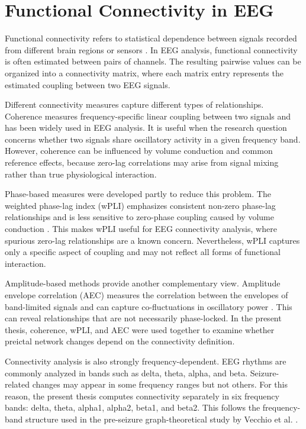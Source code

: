 \section{Functional Connectivity in EEG}
\label{sec:background-functional-connectivity}

Functional connectivity refers to statistical dependence between signals
recorded from different brain regions or sensors \cite{Friston1994}. In EEG
analysis, functional connectivity is often estimated between pairs of channels.
The resulting pairwise values can be organized into a connectivity matrix, where
each matrix entry represents the estimated coupling between two EEG signals.

Different connectivity measures capture different types of relationships.
Coherence measures frequency-specific linear coupling between two signals and
has been widely used in EEG analysis. It is useful when the research question
concerns whether two signals share oscillatory activity in a given frequency
band. However, coherence can be influenced by volume conduction and common
reference effects, because zero-lag correlations may arise from signal mixing
rather than true physiological interaction.

Phase-based measures were developed partly to reduce this problem. The weighted
phase-lag index (wPLI) emphasizes consistent non-zero phase-lag relationships
and is less sensitive to zero-phase coupling caused by volume conduction
\cite{Vinck2011}. This makes wPLI useful for EEG connectivity analysis, where
spurious zero-lag relationships are a known concern. Nevertheless, wPLI captures
only a specific aspect of coupling and may not reflect all forms of functional
interaction.

Amplitude-based methods provide another complementary view. Amplitude envelope
correlation (AEC) measures the correlation between the envelopes of
band-limited signals and can capture co-fluctuations in oscillatory power
\cite{Bruns2000,Hipp2012}. This can reveal relationships that are not
necessarily phase-locked. In the present thesis, coherence, wPLI, and AEC were
used together to examine whether preictal network changes depend on the
connectivity definition.

Connectivity analysis is also strongly frequency-dependent. EEG rhythms are
commonly analyzed in bands such as delta, theta, alpha, and beta. Seizure-related
changes may appear in some frequency ranges but not others. For this reason, the
present thesis computes connectivity separately in six frequency bands: delta,
theta, alpha1, alpha2, beta1, and beta2. This follows the frequency-band
structure used in the pre-seizure graph-theoretical study by Vecchio et al.
\cite{Vecchio2016}.

